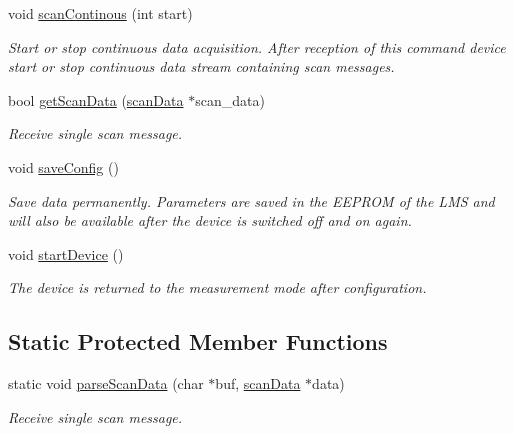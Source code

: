 \begin{DoxyCompactItemize}
void \hyperlink{classLMS1xx_a0cb0158a78d64667e31c5216871cd656}{scan\+Continous} (int start)
\begin{DoxyCompactList}\small\item\em Start or stop continuous data acquisition. After reception of this command device start or stop continuous data stream containing scan messages. \end{DoxyCompactList}\item 
bool \hyperlink{classLMS1xx_a079674c2c50e13cc9089e3c0f09a5d28}{get\+Scan\+Data} (\hyperlink{structscanData}{scan\+Data} $\ast$scan\+\_\+data)
\begin{DoxyCompactList}\small\item\em Receive single scan message. \end{DoxyCompactList}\item 
\mbox{\label{classLMS1xx_a732cb24abc56dfa36bef0e98830c0b17}} 
void \hyperlink{classLMS1xx_a732cb24abc56dfa36bef0e98830c0b17}{save\+Config} ()
\begin{DoxyCompactList}\small\item\em Save data permanently. Parameters are saved in the E\+E\+P\+R\+OM of the L\+MS and will also be available after the device is switched off and on again. \end{DoxyCompactList}\item 
\mbox{\label{classLMS1xx_ae6af68b09685305614c3155670961e8c}} 
void \hyperlink{classLMS1xx_ae6af68b09685305614c3155670961e8c}{start\+Device} ()
\begin{DoxyCompactList}\small\item\em The device is returned to the measurement mode after configuration. \end{DoxyCompactList}\end{DoxyCompactItemize}
\subsection*{Static Protected Member Functions}
\begin{DoxyCompactItemize}
\item 
static void \hyperlink{classLMS1xx_af464cc59dd48de8497e9d52599b5c292}{parse\+Scan\+Data} (char $\ast$buf, \hyperlink{structscanData}{scan\+Data} $\ast$data)
\begin{DoxyCompactList}\small\item\em Receive single scan message. \end{DoxyCompactList}\end{DoxyCompactItemize}
